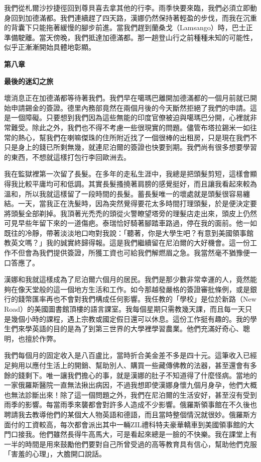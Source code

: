 我們從札爾沙抄捷徑回到尊貝喜去拿其他的行李。雨季快要來臨，我們必須立即動身回到加德滿都。我們連續趕了四天路，漢娜仍然保持著輕盈的步伐，而我在沉重的背囊下只能拖著緩慢的腳步前進。當我們趕到蘭桑戈（Lamsango）時，巴士正準備駛離。當天傍晚，我們抵達加德滿都。那一趟登山行之前種種未知的可能性，似乎正漸漸開始具體地彰顯。

\textbf{第八章}

\textbf{最後的迷幻之旅}

壞消息正在加德滿都等待著我們。我們早在噶瑪巴離開加德滿都的一個月前就已開始申請錫金的簽證。德里內務部竟然在兩個月後的今天斷然拒絕了我們的申請。這是一個障礙。只要想到我們因為這些無能的印度官僚被迫與噶瑪巴分開，心裡就非常難受。除此之外，我們也不得不考慮一些很現實的問題。儘管布塔拉錫米一如往常的熱心，幫我們在喇嘛傑珠的住所附近找了一個很棒的出租房，只是現在我們不只是身上的錢已所剩無幾，就連尼泊爾的簽證也快要到期。我們尚有很多想要學習的東西，不想就這樣打包行李回歐洲去。

我在監獄裡第一次留了長髮。在多年的走私生涯中，我總是把頭髮剪短，這樣會顯得我比較平庸均可和低調。其實長髮搔撓著肩膀的感覺挺好，而且讓我看起來較為溫和，所以我就這樣留了一段時間的長髮。蓄長髮唯一的壞處就是頭髮很容易纏結。一天，當我正在洗髮時，因為突然覺得要花太多時間打理頭髮，於是便決定要將頭髮全部剃掉。我頂著光禿禿的頭從火警瞭望塔旁的理髮店走出來，頭皮上仍然可見早些年留下來的一道傷疤。泰瑞恰好騎著腳踏車路過，停在我的面前。他一如既往的冷靜，帶著淡淡地口吻對我說：「聽著，你是大學生吧？有意到美國領事館教英文嗎？」我的誠實終歸得報。這是我們繼續留在尼泊爾的大好機會。這一份工作不但會為我們提供簽證，所獲工資也可給我們解燃眉之急。我當然毫不猶豫便一口答應了。

漢娜和我就這樣成為了尼泊爾六個月的居民。我們是那少數非常幸運的人，竟然能夠在像天堂般的這一個地方生活和工作。如今那越發嚴格的簽證審批條例，或是銀行的錢幣匯率再也不會對我們構成任何影響。我任教的「學校」是位於新路（New
Road）的美國圖書館頂樓的語言課室。我每個星期只需教幾天課，而且每一天只是幾個小時的課程，遇上宗教或國定假日還可以休息。這份工作挺有趣的。我的學生們來學英語的目的是為了到第三世界的大學裡學習農業。他們充滿好奇心、聰明，也擅於作弊。

我們每個月的固定收入是八百盧比，當時折合美金差不多是四十元。這筆收入已經足夠用以應付生活上的開銷、幫助別人、購買一些藏傳佛教的法器，甚至還會有多餘的錢剩下。唯一讓我們擔心的事，就是漢娜的肚子不知道得了什麼怪病。當地的一家俄羅斯醫院一直無法揪出病因，不過我想即使漢娜身懷九個月身孕，他們大概也無法診斷出來！除了這一個問題之外，我們在尼泊爾的生活安好，甚至沒有受到雨季的影響。每當雨季來襲都會對許多人造成不少影響。俄羅斯領事館在不久後也聘請我去教導他們的某個大人物英語和德語，而且當時整個情況就很妙。俄羅斯方面付的工資較高，每次都會派出其中一輛ZIL禮科特夫豪華轎車到美國領事館的大門口接我。他們雖然長得牛高馬大，可是看起來總是一臉的不快樂。我在課堂上有一半的時間是用來鼓勵他們要對自己所曾受過的高等教育具有信心，幫助他們克服「害羞的心理」，大膽開口說話。

